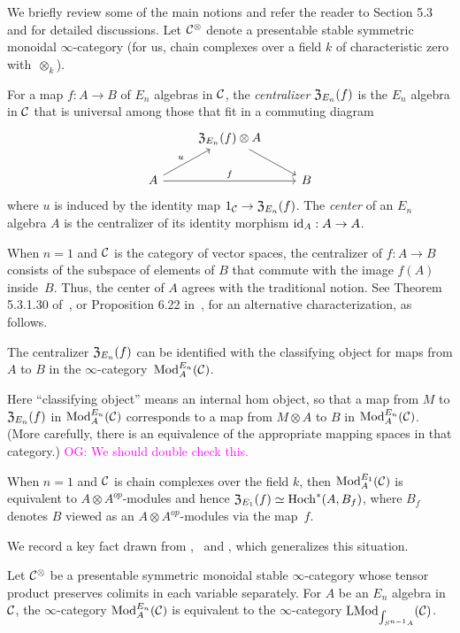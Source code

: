 \documentclass[11pt]{amsart}
\numberwithin{equation}{section}
\def\owen{\textcolor{magenta}{OG: }\textcolor{magenta}}
\begin{document}
We briefly review some of the main notions and refer the reader to \cite{LurieHA} Section 5.3 and \cite{FrancisHH} for detailed discussions. Let $\mathcal C^\otimes$ denote a presentable stable symmetric monoidal $\infty$-category (for us, chain complexes over a field $k$ of characteristic zero with~$\otimes_k$).

\begin{dfn}
For a map $f: A \to B$ of $E_n$ algebras in $\mathcal C$, 
the {\em centralizer} ${\frak Z}_{E_n}(f)$ is the $E_n$ algebra in $\mathcal C$ that is universal among those that fit in a commuting diagram
\[
\begin{tikzcd}
& {\frak Z}_{E_n}(f) \otimes A \arrow[dr] & \\
A \arrow[ur, "u"] \arrow[rr, "f"] && B
\end{tikzcd}
\]
where $u$ is induced by the identity map $1_\mathcal C \to {\frak Z}_{E_n}(f)$. The {\em center} of an $E_n$ algebra $A$ is the centralizer of its identity morphism ${\rm id}_A: A \to A$.
\end{dfn}
When $n=1$ and $\mathcal C$ is the category of vector spaces, the centralizer of $f: A \to B$ consists of the subspace of elements of $B$ that commute with the image $f(A)$ inside~$B$. Thus, the center of $A$ agrees with the traditional notion. See Theorem 5.3.1.30 of~\cite{LurieHA}, or Proposition 6.22 in~\cite{GTZ3}, for an alternative characterization,
as follows.

\begin{prp}
The centralizer ${\frak Z}_{E_n}(f)$ can be identified with the classifying object for maps from $A$ to $B$ in the $\infty$-category~${\rm Mod}^{E_n}_A(\mathcal C)$.
\end{prp} 

Here ``classifying object'' means an internal hom object, so that a map from $M$ to ${\frak Z}_{E_n}(f)$ in ${\rm Mod}^{E_n}_A(\mathcal C)$ corresponds to a map from $M \otimes A$ to $B$ in ${\rm Mod}^{E_n}_A(\mathcal C)$. 
(More carefully, there is an equivalence of the appropriate mapping spaces in that category.)
\owen{We should double check this.}

When $n=1$ and $\mathcal C$ is chain complexes over the field $k$, then ${\rm Mod}^{E_1}_A(\mathcal C)$ is equivalent to $A\otimes A^{op}$-modules and hence ${\frak Z}_{E_1}(f) \simeq {\rm Hoch}^*(A,B_f)$,
where $B_f$ denotes $B$ viewed as an $A\otimes A^{op}$-modules via the map~$f$.

We record a key fact drawn from \cite{LurieHA},~\cite{FrancisHH}  and \cite{GG-Notes}, which generalizes this situation.

\begin{prp}
Let $\mathcal C^\otimes$ be a presentable symmetric monoidal stable $\infty$-category whose tensor product preserves colimits in each variable separately.
For $A$ be an $E_n$ algebra in $\mathcal C$,
the $\infty$-category ${\rm Mod}^{E_n}_A(\mathcal C)$ is equivalent to the $\infty$-category ${\rm LMod}_{\int_{S^{n-1} A}}(\mathcal C)$.
\end{prp}
\end{document}
